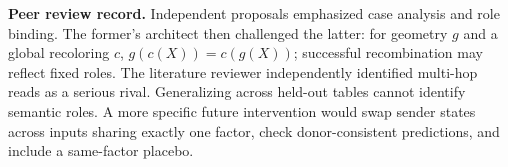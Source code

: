 \documentclass[11pt]{article}
\begin{document}
\par
\textbf{Peer review record.} Independent proposals emphasized case analysis and role binding. The former's architect then challenged the latter: for geometry $g$ and a global recoloring $c$, $g(c(X))=c(g(X))$; successful recombination may reflect fixed roles. The literature reviewer independently identified multi-hop reads as a serious rival. Generalizing across held-out tables cannot identify semantic roles. A more specific future intervention would swap sender states across inputs sharing exactly one factor, check donor-consistent predictions, and include a same-factor placebo.
\newpage

\newpage

\newpage

\newpage

\newpage

\newpage

\newpage


\end{document}
